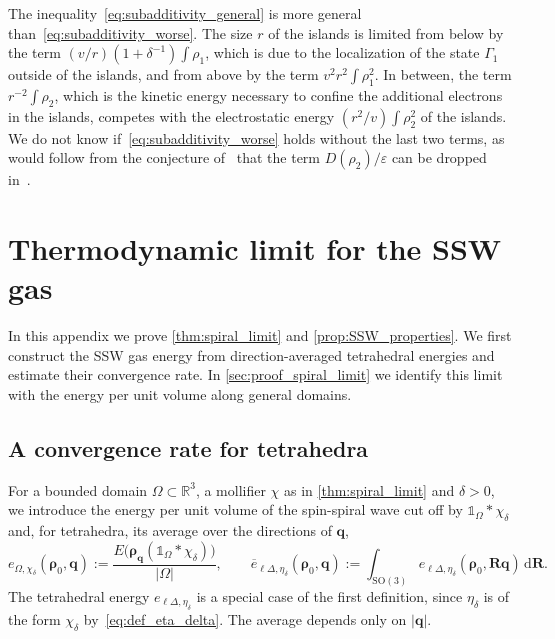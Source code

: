 \documentclass[final,reqno]{amsart}
\theoremstyle{remark}
\renewcommand{\epsilon}{\varepsilon}
\newcommand{\ol}[1]{\overline{#1}}
\newcommand{\RR}{\mathbb{R}}
\newcommand{\SO}{\mathrm{SO}}
\newcommand{\iden}{\mathbb{1}}
\newcommand{\tetra}{\mathbb{\Delta}}
\newcommand{\dd}{\mathrm{d}}
\begin{document}
The inequality~\cref{eq:subadditivity_general} is more general than~\cref{eq:subadditivity_worse}. The size $r$ of the islands is limited from below by the term $(v/r)(1+\delta^{-1})\int\rho_1$, which is due to the localization of the state $\Gamma_1$ outside of the islands, and from above by the term $v^2r^2\int\rho_1^2$. In between, the term $r^{-2}\int\rho_2$, which is the kinetic energy necessary to confine the additional electrons in the islands, competes with the electrostatic energy $(r^2/v)\int\rho_2^2$ of the islands. We do not know if~\cref{eq:subadditivity_worse} holds without the last two terms, as would follow from the conjecture of~\cite{lewin2020local} that the term $D(\rho_2)/\epsilon$ can be dropped in~\cite[Lemma~19]{lewin2020local}.

\section{Thermodynamic limit for the SSW gas}\label{app:SSW_limit}
In this appendix we prove \cref{thm:spiral_limit} and \cref{prop:SSW_properties}. We first construct the SSW gas energy from direction-averaged tetrahedral energies and estimate their convergence rate. In \cref{sec:proof_spiral_limit} we identify this limit with the energy per unit volume along general domains.

\subsection{A convergence rate for tetrahedra}\label{sec:CV_rate_spiral}

For a bounded domain $\Omega\subset\RR^3$, a mollifier $\chi$ as in \cref{thm:spiral_limit} and $\delta>0$, we introduce the energy per unit volume of the spin-spiral wave cut off by $\iden_\Omega\ast\chi_\delta$ and, for tetrahedra, its average over the directions of $\mathbf{q}$,
\begin{equation}\label{eq:def_e_bar}
e_{\Omega,\chi_\delta}(\bm{\rho}_0,\mathbf{q}):=\frac{E\big(\bm{\rho}_{\mathbf{q}}(\iden_\Omega\ast\chi_\delta)\big)}{|\Omega|},\qquad \ol{e}_{\ell\tetra,\eta_\delta}(\bm{\rho}_0,\mathbf{q}):=\int_{\SO(3)}e_{\ell\tetra,\eta_\delta}(\bm{\rho}_0,\mathbf{R}\mathbf{q})\,\dd\mathbf{R}.
\end{equation}
The tetrahedral energy $e_{\ell\tetra,\eta_\delta}$ is a special case of the first definition, since $\eta_\delta$ is of the form $\chi_\delta$ by~\cref{eq:def_eta_delta}. The average depends only on $|\mathbf{q}|$.
\end{document}
